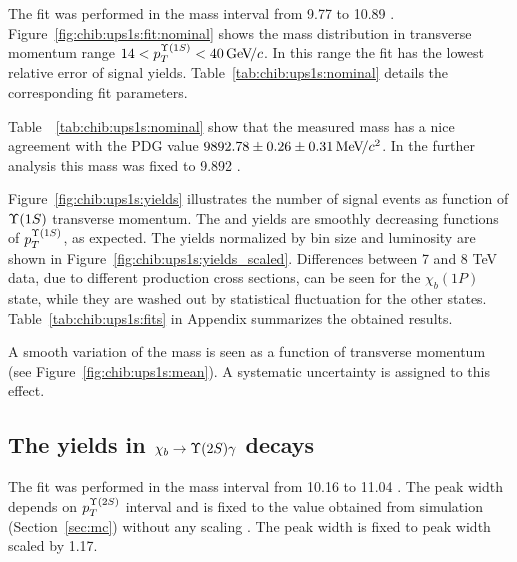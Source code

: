The fit was performed in the mass interval from  9.77 \gevcc to 10.89 \gevcc.
Figure~\ref{fig:chib:ups1s:fit:nominal} shows the mass distribution in transverse
momentum range $14 < p_T^{\OneS} < 40 \gevc$. In this range the fit has
the lowest relative error of signal yields. Table~\ref{tab:chib:ups1s:nominal}
details the corresponding fit parameters.




Table~~\ref{tab:chib:ups1s:nominal} show that the measured \chiboneOneP mass
has a  nice agreement with the PDG value $9892.78 \pm 0.26 \pm 0.31 {\mathrm{\,Me\kern -0.1em V\!/}c^2}$.
In the further analysis this mass was fixed to 9.892 \gevcc.

% 

Figure~\ref{fig:chib:ups1s:yields} illustrates the number of signal events as
function of $\Y1S$ transverse momentum. The \chibOneP and \chibThreeP yields
are smoothly decreasing functions of $p_T^{\Y1S}$, as expected. The yields
normalized by bin size and luminosity are shown in
Figure~\ref{fig:chib:ups1s:yields_scaled}. Differences between 7 and 8 TeV
data, due to different production cross sections, can be seen for the
$\chi_b(1P)$ state, while they are washed out by statistical fluctuation for
the other states. Table~\ref{tab:chib:ups1s:fits} in Appendix summarizes the
obtained results.



A smooth variation of the \chiboneOneP mass is seen as a function of
transverse momentum (see Figure~\ref{fig:chib:ups1s:mean}). A systematic
uncertainty is assigned to this effect.




\subsection{The \texorpdfstring{\chib}{chib} yields in
	\texorpdfstring{$\chib \to \Y2S \gamma$}{chib --> Y(2S) gamma} decays}
\label{sec:chib:ups2s:fit}

The fit was performed in the mass interval from 10.16 \gevcc to 11.04 \gevcc.
The  \chiboneTwoP peak width depends on $p_T^{\Y2S}$ interval and is fixed to
the value obtained from simulation (Section~\ref{sec:mc}) without any scaling .
The \chiboneThreeP peak width is fixed to \chiboneTwoP peak width scaled by
1.17.


